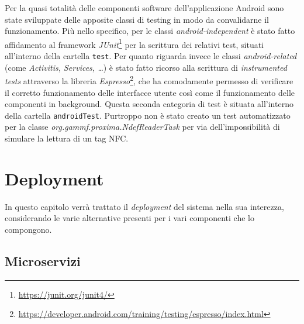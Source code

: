 \documentclass[a4paper,12pt]{report}
\begin{document}
Per la quasi totalità delle componenti software dell'applicazione Android sono state sviluppate delle apposite classi di testing in modo da convalidarne il funzionamento. Più nello specifico, per le classi \emph{android-independent} è stato fatto affidamento al framework \emph{JUnit}\footnote{\url{https://junit.org/junit4/}} per la scrittura dei relativi test, situati all'interno della cartella \texttt{test}. Per quanto riguarda invece le classi \emph{android-related} (come \emph{Activitis, Services, \dots}) è stato fatto ricorso alla scrittura di \emph{instrumented tests} attraverso la libreria \emph{Espresso}\footnote{\url{https://developer.android.com/training/testing/espresso/index.html}}, che ha comodamente permesso di verificare il corretto funzionamento delle interfacce utente così come il funzionamento delle componenti in background. Questa seconda categoria di test è situata all'interno della cartella \texttt{androidTest}. Purtroppo non è stato creato un test automatizzato per la classe \emph{org.gammf.proxima.NdefReaderTask} per via dell'impossibilità di simulare la lettura di un tag NFC.


\chapter{Deployment} \label{deployment}

In questo capitolo verrà trattato il \emph{deployment} del sistema nella sua interezza, considerando le varie alternative presenti per i vari componenti che lo compongono.

\section{Microservizi}
\end{document}
